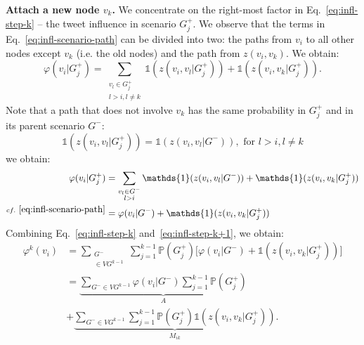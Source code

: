 \textbf{Attach a new node $v_k$.}
We concentrate on the right-most factor in Eq.~\eqref{eq:infl-step-k} -- the tweet influence in scenario $G^+_j$.
We observe that the terms in Eq.~\eqref{eq:infl-scenario-path} can be divided into two:
the paths from $v_i$ to all other nodes except $v_k$ (i.e. the old nodes) and the path from $z(v_i, v_k)$.
We obtain:
%
%
\begin{equation*}
	\varphi(v_i|G_j^+) = \sum_{\substack{v_l\in{G_j^+}\\l>i, l\neq k}} \mathds{1}(z(v_i,v_l|G_j^+)) + \mathds{1}(z(v_i,v_k|G_j^+)).
\end{equation*}
Note that a path that does not involve $v_k$ has the same probability in $G_j^+$ and in its parent scenario $G^-$:
\begin{equation*}
	\mathds{1}(z(v_i,v_l|G_j^+)) = \mathds{1}(z(v_i,v_l|G^-)), \text{ for } l > i, l \neq k
\end{equation*}
we obtain:
\begin{align}
				\varphi(v_i|G_j^+) 		&= \sum_{\substack{v_l\in{G^-}\\l>i}} \mathds{1}(z(v_i,v_l|G^-)) + \mathds{1}(z(v_i,v_k|G_j^+)) \nonumber \\
^{cf.~\eqref{eq:infl-scenario-path}}	&= \varphi(v_i | G^-) + \mathds{1}(z(v_i,v_k|G_j^+)) \label{eq:infl-step-k+1}
\end{align}
Combining Eq.~\eqref{eq:infl-step-k} and~\eqref{eq:infl-step-k+1}, we obtain:
\begin{align}
\varphi^k(v_i) &= \sum_{\substack{G^-\\\in VG^{k-1}}}\sum^{k-1}_{j=1} \mathds{P}(G_j^+) \bigg[ \varphi(v_i | G^-) + \mathds{1}(z(v_i,v_k|G_j^+)) \bigg] \nonumber \\
        &= \underbrace{\sum_{G^- \in {VG^{k-1}}} \varphi(v_i | G^-) \sum^{k-1}_{j=1}\mathds{P}(G_j^+) }_{A} \nonumber \\
        &+ \underbrace{\sum_{G^- \in {VG^{k-1}}}\sum^{k-1}_{j=1} \mathds{P}(G_j^+) \mathds{1}(z(v_i,v_k|G_j^+)) }_{M_{ik}}. \label{eq:two-parts}
\end{align}

